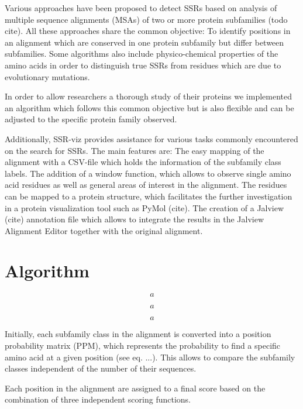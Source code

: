\documentclass{bioinfo}
\begin{document}
Various approaches have been proposed to detect SSRs based on analysis of multiple sequence 
alignments (MSAs) of two or more protein subfamilies (todo cite). All these approaches share the 
common objective: To identify positions in an alignment which are conserved in one 
protein subfamily but differ between subfamilies. Some algorithms also include
physico-chemical properties of the amino acids in order to distinguish
true SSRs from residues which are due to evolutionary mutations. 

In order to allow researchers a thorough study of their proteins we implemented an algorithm 
which follows this common objective but is also flexible and can be adjusted to the specific 
protein family observed.

Additionally, SSR-viz provides assistance for various tasks commonly encountered on the search for SSRs.
The main features are: The easy mapping of the alignment with a CSV-file which holds the information of 
the subfamily class labels. The addition of a window function, which allows to observe
single amino acid residues as well as general areas of interest in the alignment.
The residues can be mapped to a protein structure, which facilitates the
further investigation in a protein visualization tool such as PyMol (cite).
The creation of a Jalview (cite) annotation file which allows to integrate the results 
in the Jalview Alignment Editor together with the original alignment.

\section{Algorithm}

\begin{equation}
a
\end{equation}

\begin{equation}
a
\end{equation}

\begin{equation}
a
\end{equation}

Initially, each subfamily class in the alignment is converted into a position 
probability matrix (PPM), which represents the probability to find a specific 
amino acid at a given position (see eq. ...). This allows to compare the subfamily classes 
independent of the number of their sequences. 

Each position in the alignment are assigned to a final score based on the combination 
of three independent scoring functions.
\end{document}
